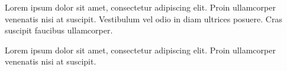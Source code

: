 \documentclass[]{plushcv}
\begin{document}
\begin{minipage}[t]{0.70\textwidth}
        \begin{tightemize}
            \item Lorem ipsum dolor sit amet, consectetur adipiscing elit. Proin ullamcorper venenatis nisi at suscipit. Vestibulum vel odio in diam ultrices posuere. Cras suscipit faucibus ullamcorper.
            \item Lorem ipsum dolor sit amet, consectetur adipiscing elit. Proin ullamcorper venenatis nisi at suscipit.
        \end{tightemize}
        \sectionsep


%
%

    \end{minipage}
    \hfill
\end{document}
